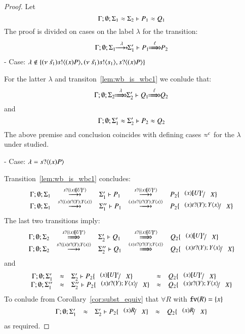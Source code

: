 \begin{proof}
	Let
	\[
		\Gamma; \emptyset; \Sigma_1 \approx \Sigma_2 \vdash P_1 \approx Q_1
	\]
	The proof is divided on cases on the label $\lambda$ for the transition:
%
	\begin{eqnarray}
		\Gamma; \es; \Sigma_1 \hby{\lambda} \Sigma_1' \proves P_1 \Hby{\ell} P_2 \label{lem:wb_is_wbc1}
	\end{eqnarray}
%
	\noi - Case: $\lambda \notin \{ (\nu\ \tilde{s_1}) s ! \langle (x) P \rangle,  (\nu\ \tilde{s_1}) s ! \langle s_1 \rangle, s ? \langle (x) P \rangle \}$

	\noi For the latter $\lambda$ and transiton~\ref{lem:wb_is_wbc1} we conlude that:	
%
	\[
		\Gamma; \es; \Sigma_2 \Hby{\lambda} \Sigma_2' \proves Q_1 \Hby{\ell} Q_2
	\]
%
	\noi and
%
	\[
		\Gamma; \emptyset; \Sigma_1' \approx \Sigma_2' \vdash P_2 \approx Q_2
	\]
%
	The above premise and conclusion coincides with defining cases $\approx^{c}$ for
	the $\lambda$ under studied.

	\noi - Case: $\lambda = s ? \langle (x) P \rangle$

	\noi Transition~\ref{lem:wb_is_wbc1} concludes:
%
\[
	\begin{array}{rclcl}
		\Gamma; \es; \Sigma_1 &\hby{\bactinp{s}{(x) \map{U}^x}}& \Sigma_1' \proves P_1 &\hby{\bactinp{s}{(x) \map{U}^x}}& P_2 \subst{(x) \map{U}^x}{X}\\
		\Gamma; \es; \Sigma_1 &\hby{\bactinp{s}{(x) \binp{t}{Y} \appl{Y}{x}}}& \Sigma_1'' \proves P_1 &\hby{(x) \bactinp{s}{ \binp{t}{Y} \appl{Y}{x}}}& P_2 \subst{(x) \binp{t}{Y} \appl{Y}{x}}{X}
	\end{array}
\]
%
	\noi The last two transitions imply:
%
\[
	\begin{array}{rclcl}
		\Gamma; \es; \Sigma_2 &\Hby{\bactinp{s}{(x) \map{U}^x}}& \Sigma_2' \proves Q_1 &\Hby{\bactinp{s}{(x) \map{U}^x}}& Q_2 \subst{(x) \map{U}^x}{X}\\
		\Gamma; \es; \Sigma_2 &\hby{\bactinp{s}{(x) \binp{t}{Y} \appl{Y}{x}}}& \Sigma_2'' \proves Q_1 &\Hby{(x) \bactinp{s}{ \binp{t}{Y} \appl{Y}{x}}}& Q_2 \subst{(x) \binp{t}{Y} \appl{Y}{x}}{X}
	\end{array}
\]
%
	\noi and
\[
	\begin{array}{rclcl}
		\Gamma; \es; \Sigma_1' &\wb& \Sigma_2' \proves P_2 \subst{(x) \map{U}^x}{X} &\wb& Q_2 \subst{(x) \map{U}^x}{X}\\
		\Gamma; \es; \Sigma_1'' &\wb& \Sigma_2'' \proves P_2 \subst{(x) \binp{t}{Y} \appl{Y}{x}}{X} &\wb& Q_2 \subst{(x) \binp{t}{Y} \appl{Y}{x}}{X}
	\end{array}
\]
%
	\noi To conlude from Corollary~\ref{cor:subst_equiv} that
	$\forall R$ with $\mathtt{fv}(R) = \{x\}$
\[
	\begin{array}{rclcl}
		\Gamma; \es; \Sigma_1' &\wb& \Sigma_2' \proves P_2 \subst{(x) R}{X} &\wb& Q_2 \subst{(x) R}{X}\\
	\end{array}
\]
	\noi as required.


\end{proof}
